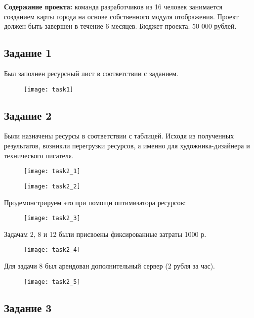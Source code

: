 \textbf{Содержание проекта:} команда разработчиков из 16 человек занимается созданием карты города на основе собственного модуля отображения. Проект должен быть завершен в течение 6 месяцев. Бюджет проекта: 50 000 рублей.


\subsection*{Задание 1}

Был заполнен ресурсный лист в соответствии с заданием.

\begin{figure}[h!]
	\texttt{[image: task1]}
\end{figure}

\subsection*{Задание 2}

Были назначены ресурсы в соответствии с таблицей. 
Исходя из полученных результатов, возникли перегрузки ресурсов, а именно для художника-дизайнера и технического  писателя.

\begin{figure}[h!]
	\texttt{[image: task2\_1]}
\end{figure}

\begin{figure}[h!]
	\texttt{[image: task2\_2]}
\end{figure}
\clearpage

Продемонстрируем это при помощи оптимизатора ресурсов:

\begin{figure}[h!]
	\texttt{[image: task2\_3]}
\end{figure}

Задачам 2, 8 и 12 были присвоены фиксированные затраты 1000 р.

\begin{figure}[h!]
	\texttt{[image: task2\_4]}
\end{figure}

Для задачи 8 был арендован дополнительный сервер (2 рубля за час).
\clearpage
\begin{figure}[h!]
	\texttt{[image: task2\_5]}
\end{figure}

\subsection*{Задание 3}

